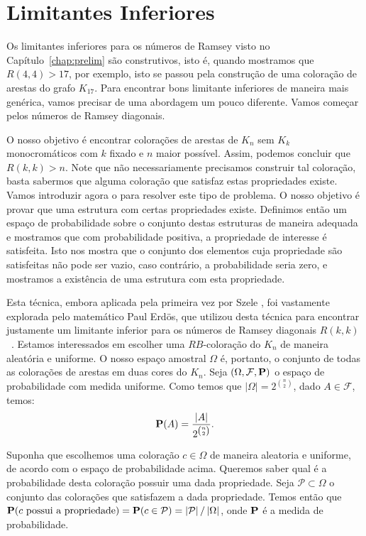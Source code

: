 
\section{Limitantes Inferiores}

Os limitantes inferiores para os números de Ramsey visto no Capítulo~\ref{chap:prelim} são construtivos, isto é, quando mostramos que $R(4,4) > 17$, por exemplo, isto se passou pela construção de uma coloração de arestas do grafo $K_{17}$. Para encontrar bons limitante inferiores de maneira mais genérica, vamos precisar de uma abordagem um pouco diferente. Vamos começar pelos números de Ramsey diagonais.

O nosso objetivo é encontrar colorações de arestas de $K_n$ sem $K_k$ monocromáticos com $k$ fixado e $n$ maior possível. Assim, podemos concluir que $R(k,k) > n$. Note que não necessariamente precisamos construir tal coloração, basta sabermos que alguma coloração que satisfaz estas propriedades existe. Vamos introduzir agora o  para resolver este tipo de problema. O nosso objetivo é provar que uma estrutura com certas propriedades existe. Definimos então um espaço de probabilidade sobre o conjunto destas estruturas de maneira adequada e mostramos que com probabilidade positiva, a propriedade de interesse é satisfeita. Isto nos mostra que o conjunto dos elementos cuja propriedade são satisfeitas não pode ser vazio, caso contrário, a probabilidade seria zero, e mostramos a existência de uma estrutura com esta propriedade.

Esta técnica, embora aplicada pela primeira vez por Szele \cite{szele1943kombinatorikai}, foi vastamente explorada pelo matemático Paul Erdös, que utilizou desta técnica para encontrar justamente um limitante inferior para os números de Ramsey diagonais $R(k,k)$~\cite{erdos47}. Estamos interessados em escolher uma $RB$-coloração do $K_n$ de maneira aleatória e uniforme. O nosso espaço amostral $\Omega$ é, portanto, o conjunto de todas as colorações de arestas em duas cores do $K_n$. Seja $(\Omega, \mathcal{F}, \operatorname{\mathbf{P}})$ o espaço de probabilidade com medida uniforme. Como temos que $|\Omega| = 2^{\binom{n}{2}}$, dado $A \in \mathcal{F}$, temos:
\[ \operatorname{\mathbf{P}}(A) = \frac{|A|}{2^{\binom{n}{2}}}.\]

Suponha que escolhemos uma coloração $c \in \Omega$ de maneira aleatoria e uniforme, de acordo com o espaço de probabilidade acima. Queremos saber qual é a probabilidade desta coloração possuir uma dada propriedade. Seja $\mathcal{P} \subset \Omega$ o conjunto das colorações que satisfazem a dada propriedade. Temos então que $\operatorname{\mathbf{P}}(c \text{ possui a propriedade}) = \operatorname{\mathbf{P}}(c \in \mathcal{P}) = \left | \mathcal{P} \right | / \left | \Omega \right |$, onde $\operatorname{\mathbf{P}}$ é a medida de probabilidade.

